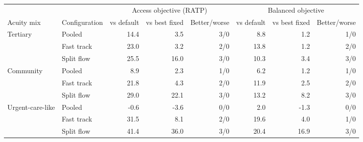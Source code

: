\begin{tabular}{llrrrrrr}
\toprule
 & & \multicolumn{3}{c}{Access objective (RATP)} & \multicolumn{3}{c}{Balanced objective} \\
\cmidrule(lr){3-5}\cmidrule(lr){6-8}
Acuity mix & Configuration & vs default & vs best fixed & Better/worse & vs default & vs best fixed & Better/worse \\
\midrule
Tertiary & Pooled & 14.4 & 3.5 & 3/0 & 8.8 & 1.2 & 1/0 \\
 & Fast track & 23.0 & 3.2 & 2/0 & 13.8 & 1.2 & 2/0 \\
 & Split flow & 25.5 & 16.0 & 3/0 & 10.3 & 3.4 & 3/0 \\
Community & Pooled & 8.9 & 2.3 & 1/0 & 6.2 & 1.2 & 1/0 \\
 & Fast track & 21.8 & 4.3 & 2/0 & 11.9 & 2.5 & 2/0 \\
 & Split flow & 29.0 & 22.1 & 3/0 & 13.2 & 8.2 & 3/0 \\
Urgent-care-like & Pooled & -0.6 & -3.6 & 0/0 & 2.0 & -1.3 & 0/0 \\
 & Fast track & 31.5 & 8.1 & 2/0 & 19.6 & 4.0 & 1/0 \\
 & Split flow & 41.4 & 36.0 & 3/0 & 20.4 & 16.9 & 3/0 \\
\bottomrule
\end{tabular}